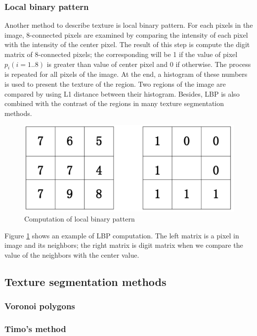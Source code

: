 \subsubsection{Local binary pattern}
Another method to describe texture is local binary pattern. For each pixels in the image, 8-connected pixels are examined by comparing the intensity of each pixel with the intensity of the center pixel. The result of this step is compute the digit matrix of 8-connected pixels; the corresponding will be 1 if the value of pixel $p_i (i=1..8)$ is greater than value of center pixel and 0 if otherwise. The process is repeated for all pixels of the image. At the end, a histogram of these numbers is used to present the texture of the region. Two regions of the image are compared by using L1 distance between their histogram. Besides, LBP is also combined with the contrast of the regions in many texture segmentation methods.
\begin{figure}[h]
	\centering
	\includegraphics[scale=0.4]{images/lbp}
	\caption{Computation of local binary pattern}
	\label{figlbp}
\end{figure}
Figure \ref{figlbp} shows an example of LBP computation. The left matrix is a pixel in image and its neighbors; the right matrix is digit matrix when we compare the value of the neighbors with the center value. 
\subsection{Texture segmentation methods}
\subsubsection{Voronoi polygons}
\subsubsection{Timo's method}
